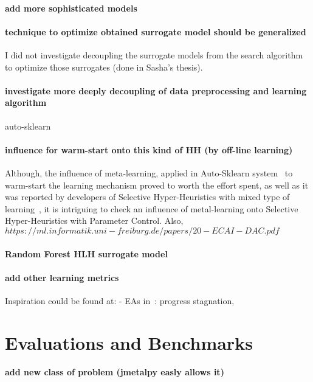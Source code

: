 \paragraph{add more sophisticated models}
\paragraph{technique to optimize obtained surrogate model should be generalized}
I did not investigate decoupling the surrogate models from the search algorithm to optimize those surrogates (done in Sasha's thesis).
\paragraph{investigate more deeply decoupling of data preprocessing and learning algorithm} auto-sklearn
\paragraph{influence for warm-start onto this kind of HH (by off-line learning)}
Although, the influence of meta-learning, applied in Auto-Sklearn system~\cite{feurer2015efficient} to warm-start the learning mechanism proved to worth the effort spent, as well as it was reported by developers of Selective Hyper-Heuristics with mixed type of learning~\cite{uludaug2013hybrid,}, it is intriguing to check an influence of metal-learning onto Selective Hyper-Heuristics with Parameter Control.
Also, $https://ml.informatik.uni-freiburg.de/papers/20-ECAI-DAC.pdf$
\paragraph{Random Forest HLH surrogate model}
\paragraph{add other learning metrics}
Inspiration could be found at:
- EAs in~\cite{karafotias2014generic}: progress stagnation, 


\section{Evaluations and Benchmarks}\label{fw: evaluation}
\paragraph{add new class of problem (jmetalpy easly allows it)}
